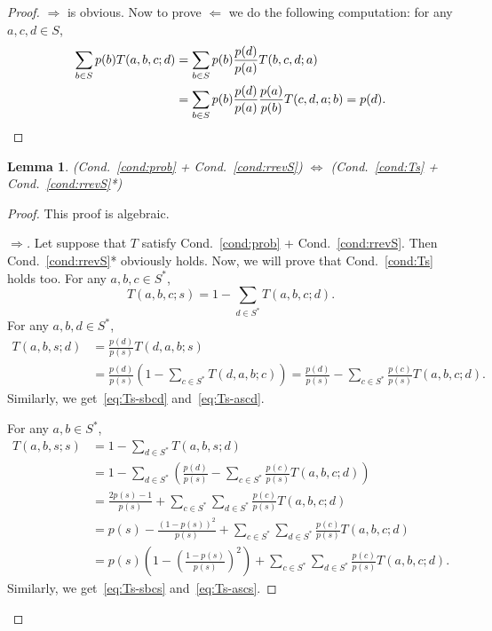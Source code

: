 \documentclass[10pt]{amsart}
\newtheorem{lemm}[theo]{Lemma}\newtheorem{prop}[theo]{Proposition}\newtheorem{coro}[theo]{Corollary}\newtheorem{conj}[theo]{Conjecture}
\theoremstyle{definition}\newtheorem{defi}[theo]{Definition}\newtheorem{rema}[theo]{Remark}\newtheorem{exam}[theo]{Example}\newtheorem{exem}[theo]{Example}\newtheorem{nota}[theo]{Notation}
\newcounter{a}
\newcommand{\Cond}{Cond.}
\begin{document}
\begin{proof}
$\Rightarrow$ is obvious. Now to prove $\Leftarrow$ we do the following computation: for any $a,c,d\in S$,
\begin{align*}
\sum_{b\in S} p(b) T(a,b,c;d) & = \sum_{b\in S} p(b) \frac{p(d)}{p(a)} T(b,c,d;a) \\
& = \sum_{b\in S} p(b) \frac{p(d)}{p(a)} \frac{p(a)}{p(b)} T(c,d,a;b) = p(d).\qedhere
\end{align*}
\end{proof}

\begin{lemm}\label{lem:equiv-5}
(\Cond~\ref{cond:prob} + \Cond~\ref{cond:rrevS}) $\Leftrightarrow$ (\Cond~\ref{cond:Ts} + \Cond~\ref{cond:rrevS}*)
\end{lemm}

\begin{proof}
This proof is algebraic.

\begin{proof}[$\Rightarrow$]
Let suppose that $T$ satisfy \Cond~\ref{cond:prob} + \Cond~\ref{cond:rrevS}. Then \Cond~\ref{cond:rrevS}* obviously holds. Now, we will prove that \Cond~\ref{cond:Ts} holds too.
For any $a,b,c \in S^*$,
\[
T(a,b,c;s) = 1 - \sum_{d \in S^*} T(a,b,c;d).
\]
For any $a,b,d \in S^*$,
\begin{align*}
T(a,b,s;d) &= \frac{p(d)}{p(s)} T(d,a,b;s) \\
&= \frac{p(d)}{p(s)} \left(1 - \sum_{c \in S^*} T(d,a,b;c)\right) = \frac{p(d)}{p(s)} - \sum_{c \in S^*} \frac{p(c)}{p(s)} T(a,b,c;d).
\end{align*}
Similarly, we get~\eqref{eq:Ts-sbcd} and~\eqref{eq:Ts-ascd}.

For any $a,b \in S^*$,
\begin{align*}
T(a,b,s;s) & = 1 - \sum_{d \in S^*} T(a,b,s;d) \\
& = 1 - \sum_{d \in S^*} \left(\frac{p(d)}{p(s)} - \sum_{c \in S^*} \frac{p(c)}{p(s)}T(a,b,c;d) \right)\\
& = \frac{2p(s)-1}{p(s)} + \sum_{c \in S^*} \sum_{d \in S^*} \frac{p(c)}{p(s)}T(a,b,c;d)\\
& = p(s) - \frac{(1-p(s))^2}{p(s)} + \sum_{c \in S^*} \sum_{d \in S^*} \frac{p(c)}{p(s)}T(a,b,c;d)\\
& = p(s) \left(1 - \left(\frac{1-p(s)}{p(s)}\right)^2 \right) + \sum_{c \in S^*} \sum_{d \in S^*} \frac{p(c)}{p(s)}T(a,b,c;d).
\end{align*}
Similarly, we get~\eqref{eq:Ts-sbcs} and~\eqref{eq:Ts-ascs}.


\end{proof}
\end{proof}
\end{document}
